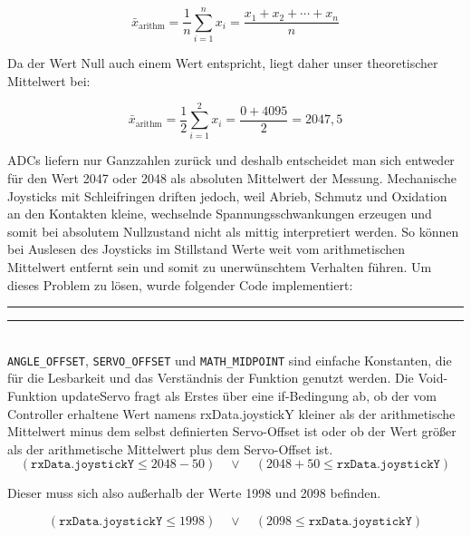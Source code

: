 \documentclass[a4paper,12pt]{article}
\begin{document}
\begin{equation}
    \bar{x}_{\text{arithm}} = \frac{1}{n} \sum_{i=1}^{n} x_i = \frac{x_1 + x_2 + \cdots + x_n}{n}
    \label{eq:arithmetic_mean}
\end{equation}

Da der Wert Null auch einem Wert entspricht, liegt daher unser theoretischer Mittelwert bei: 

\begin{equation}
    \bar{x}_{\text{arithm}} = \frac{1}{2} \sum_{i=1}^{2} x_i = \frac{0 + 4095}{2} = 2047,5
    \label{eq:arithmetic_mean_2}
\end{equation}

ADCs liefern nur Ganzzahlen zurück und deshalb entscheidet man sich entweder für den Wert 2047 oder 2048 als absoluten Mittelwert der Messung. Mechanische Joysticks mit Schleifringen driften jedoch, weil Abrieb, Schmutz und Oxidation an den Kontakten kleine, wechselnde Spannungsschwankungen erzeugen und somit bei absolutem Nullzustand nicht als mittig interpretiert werden. So können bei Auslesen des Joysticks im Stillstand Werte weit vom arithmetischen Mittelwert entfernt sein und somit zu unerwünschtem Verhalten führen. Um dieses Problem zu lösen, wurde folgender Code implementiert: \newline

\noindent\rule{\linewidth}{0.4pt}  %

\noindent\rule{\linewidth}{0.4pt}\\[0.5em]  %

\texttt{ANGLE\_OFFSET}, \texttt{SERVO\_OFFSET} und \texttt{MATH\_MIDPOINT} sind einfache Konstanten, die für die Lesbarkeit und das Verständnis der Funktion genutzt werden. Die Void-Funktion updateServo fragt als Erstes über eine if-Bedingung ab, ob der vom Controller erhaltene Wert namens rxData.joystickY kleiner als der arithmetische Mittelwert minus dem selbst definierten Servo-Offset ist oder ob der Wert größer als der arithmetische Mittelwert plus dem Servo-Offset ist. 
\begin{equation}
(\texttt{rxData.joystickY} \leq 2048 - 50) \quad \lor \quad (2048 + 50 \leq \texttt{rxData.joystickY})
\end{equation}

Dieser muss sich also außerhalb der Werte 1998 und 2098 befinden.

\begin{equation}
(\texttt{rxData.joystickY} \leq 1998) \quad \lor \quad (2098 \leq \texttt{rxData.joystickY})
\end{equation}
\end{document}
